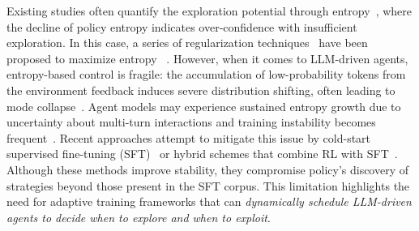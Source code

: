 \documentclass[]{youtu} %
\begin{document}
Existing studies often quantify the exploration potential through entropy~\cite{sutton1988learning,williams1991function,cui2025entropy,xue2025simpletir}, where the decline of policy entropy indicates 
{over-confidence
with insufficient exploration.}
In this case, a series of regularization techniques~\cite{ziebart2008maximum,schulman2017proximal,haarnoja2018soft} have been proposed to maximize entropy
~\cite{haarnoja2017reinforcement,zhao2019maximum,xin2020exploration,zhang2021exploration,seo2021state,mehr2023maximum,kim2023adaptive,hao2023exploration}.
However, when it comes to LLM-driven agents, entropy-based control is fragile: the accumulation of low-probability tokens from the environment feedback induces severe distribution shifting, often leading to mode collapse~\cite {xue2025simpletir,dong2025agentic}.
{Agent} models may experience sustained entropy growth due to 
uncertainty about multi-turn interactions
and training instability becomes frequent~\cite{mai2025agent,yao2025offpolicy,wang2025ragen}.
Recent approaches attempt to mitigate this issue by 
cold-start supervised fine-tuning (SFT)~\cite{tao2025webshaper,qin2025ui,feng2025retool,qin2025unleashing} or 
hybrid schemes that combine RL with SFT~\cite{zhang2025policy}.
Although these methods improve stability, 
they compromise {policy's discovery of} strategies beyond those present in the SFT corpus.
This limitation highlights the need for adaptive training frameworks that can \textit{dynamically schedule LLM-driven agents to decide when to explore and when to exploit}.
\end{document}
